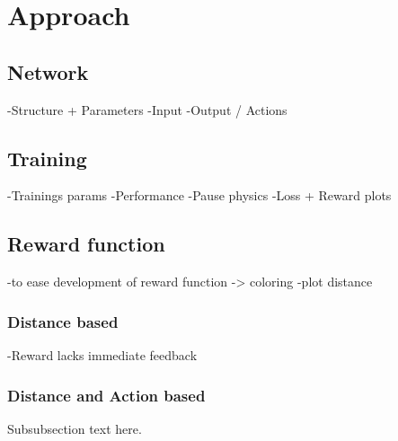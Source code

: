 
\section{Approach}

\subsection{Network}
-Structure + Parameters
-Input
-Output / Actions

\subsection{Training}
-Trainings params
-Performance 
-Pause physics
-Loss + Reward plots

\subsection{Reward function}
-to ease development of reward function -> coloring
-plot distance 

\subsubsection{Distance based}
-Reward lacks immediate feedback
\subsubsection{Distance and Action based}
Subsubsection text here.